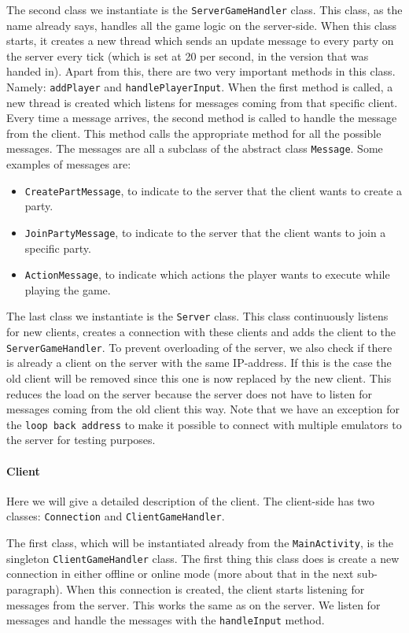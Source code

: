 \documentclass[../main.tex]{subfiles}
\begin{document}
		The second class we instantiate is the \texttt{ServerGameHandler} class. This class, as the name already says, handles all the game logic on the server-side. When this class starts, it creates a new thread which sends an update message to every party on the server every tick (which is set at 20 per second, in the version that was handed in). Apart from this, there are two very important methods in this class. Namely: \texttt{addPlayer} and \texttt{handlePlayerInput}. When the first method is called, a new thread is created which listens for messages coming from that specific client. Every time a message arrives, the second method is called to handle the message from the client. This method calls the appropriate method for all the possible messages. The messages are all a subclass of the abstract class \texttt{Message}. Some examples of messages are: 
		\begin{itemize}
			\item \texttt{CreatePartMessage}, to indicate to the server that the client wants to create a party.
			\item \texttt{JoinPartyMessage}, to indicate to the server that the client wants to join a specific party.
			\item \texttt{ActionMessage}, to indicate which actions the player wants to execute while playing the game.
		\end{itemize}
		The last class we instantiate is the \texttt{Server} class. This class continuously listens for new clients, creates a connection with these clients and adds the client to the \texttt{ServerGameHandler}. To prevent overloading of the server, we also check if there is already a client on the server with the same IP-address. If this is the case the old client will be removed since this one is now replaced by the new client. This reduces the load on the server because the server does not have to listen for messages coming from the old client this way. Note that we have an exception for the \texttt{loop back address} to make it possible to connect with multiple emulators to the server for testing purposes.

		\paragraph{Client}
		Here we will give a detailed description of the client. The client-side has two classes: \texttt{Connection} and \texttt{ClientGameHandler}.

		The first class, which will be instantiated already from the \texttt{MainActivity}, is the singleton \texttt{ClientGameHandler} class. The first thing this class does is create a new connection in either offline or online mode (more about that in the next sub-paragraph). When this connection is created, the client starts listening for messages from the server. This works the same as on the server. We listen for messages and handle the messages with the \texttt{handleInput} method. 
		
\end{document}
